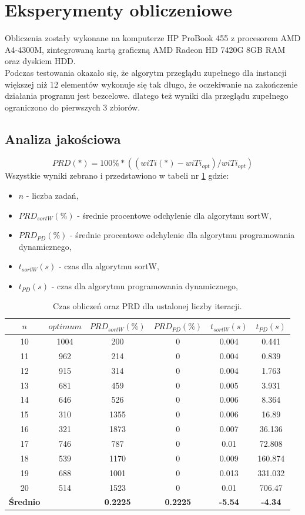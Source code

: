 \documentclass[a4paper]{article}
\begin{document}
\section{Eksperymenty obliczeniowe}
Obliczenia zostały wykonane na komputerze HP ProBook 455 z procesorem AMD A4-4300M, zintegrowaną kartą graficzną AMD Radeon HD 7420G 8GB RAM oraz dyskiem HDD.
\\
Podczas testowania okazało się, że algorytm przeglądu zupełnego dla instancji większej niż 12 elementów wykonuje się tak długo, że oczekiwanie na zakończenie działania programu jest bezcelowe. dlatego też wyniki dla przeglądu zupełnego ograniczono do pierwszych 3 zbiorów.

\subsection{Analiza jakościowa}
\begin{equation}
PRD(*)=100\%*((wiTi(*)-wiTi_{opt})/wiTi_{opt})
\end{equation}
Wszystkie wyniki zebrano i przedstawiono w tabeli nr \ref{tab:result} gdzie:
\begin{itemize}
\item $n$ - liczba zadań,
\item $PRD_{sortW}(\%)$ - średnie procentowe odchylenie dla algorytmu sortW,
\item $PRD_{PD}(\%)$ - średnie procentowe odchylenie dla algorytmu programowania dynamicznego,
\item $t_{sortW}(s)$ - czas dla algorytmu sortW,
\item $t_{PD}(s)$ - czas dla algorytmu programowania dynamicznego,
\end{itemize}
\begin{table}[h!]
\centering
	\caption{Czas obliczeń oraz PRD dla ustalonej liczby iteracji.}
	\label{tab:result}
	{\begin{tabular}{cccccc}
		\hline
		$n$ &$optimum$&$PRD_{sortW}(\%)$ & $PRD_{PD}(\%)$& $t_{sortW}(s)$& $t_{PD}(s)$ \\
		\hline
       	10 & 1004 & 200 & 0 & 0.004 & 0.441 \\
		11 & 962 & 214 & 0 & 0.004 & 0.839\\
		12 & 915 & 314 & 0 & 0.004 & 1.763\\
		13 & 681 & 459 & 0 & 0.005 & 3.931\\
		14 & 646 & 526 & 0 & 0.006 & 8.364\\
		15 & 310 & 1355 & 0 & 0.006 & 16.89 \\
		16 & 321 & 1873 & 0 & 0.007 & 36.136 \\
		17 & 746 & 787 & 0 & 0.01 & 72.808 \\
		18 & 539 & 1170 & 0 & 0.009 & 160.874 \\
		19 & 688 & 1001 & 0 & 0.013 & 331.032 \\
		20 & 514 & 1523 & 0 & 0.01 & 706.47 \\		
		
		\hline
		\bf{Średnio}& & \bf{0.2225}& \bf{0.2225}& \bf{-5.54}& \bf{-4.34} \\
		\hline
	\end{tabular}}
\end{table}
\end{document}
